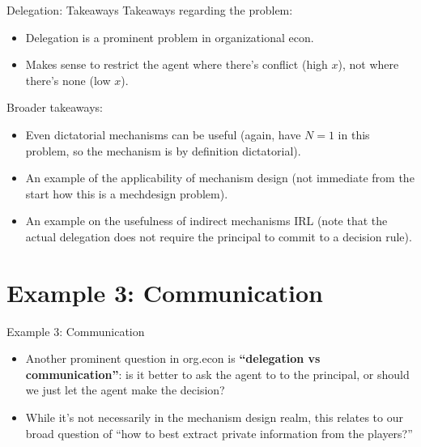 \documentclass[english,10pt
,aspectratio=169
]{beamer}
\begin{document}
\begin{frame}{Delegation: Takeaways}
	Takeaways regarding the problem:
	\begin{itemize}
		\item Delegation is a prominent problem in organizational econ.
		\item Makes sense to restrict the agent where there's conflict (high $x$), not where there's none (low $x$).
	\end{itemize}

	Broader takeaways:
	\begin{itemize}
		\item Even dictatorial mechanisms can be useful (again, have $N=1$ in this problem, so the mechanism is by definition dictatorial).
		\item An example of the applicability of mechanism design (not immediate from the start how this is a mechdesign problem).
		\item An example on the usefulness of indirect mechanisms IRL (note that the actual delegation does not require the principal to commit to a decision rule).
	\end{itemize}
\end{frame}



\section{Example 3: Communication}

\begin{frame}{Example 3: Communication}
	\begin{itemize}
		\item Another prominent question in org.econ is \textbf{``delegation vs communication''}: is it better to ask the agent to  to the principal, or should we just let the agent \alert{make the decision}?
		
		\item While it's not necessarily in the mechanism design realm, this relates to our broad question of ``how to best extract private information from the players?''
	\end{itemize}
\end{frame}
\end{document}
